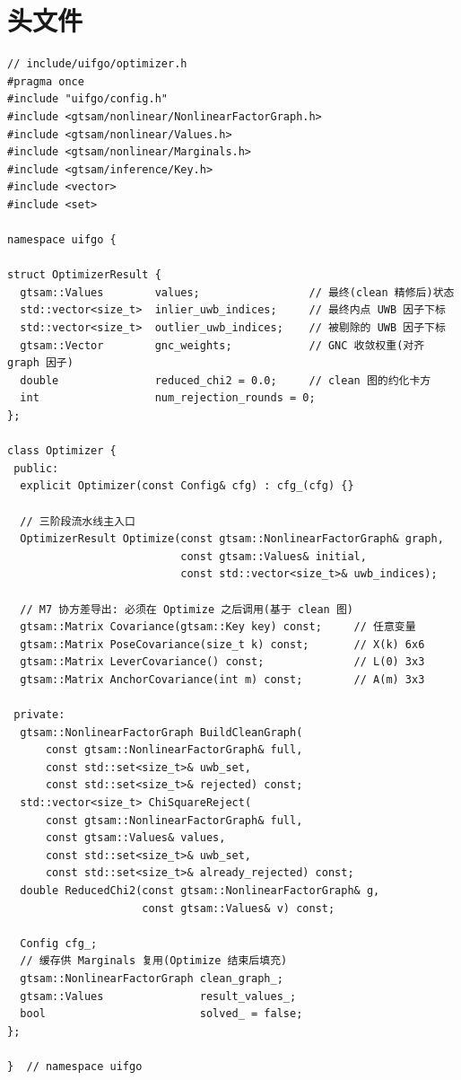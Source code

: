\documentclass[11pt,a4paper]{report}
\begin{document}
\section{头文件}
\begin{lstlisting}[style=cpp]
// include/uifgo/optimizer.h
#pragma once
#include "uifgo/config.h"
#include <gtsam/nonlinear/NonlinearFactorGraph.h>
#include <gtsam/nonlinear/Values.h>
#include <gtsam/nonlinear/Marginals.h>
#include <gtsam/inference/Key.h>
#include <vector>
#include <set>

namespace uifgo {

struct OptimizerResult {
  gtsam::Values        values;                 // 最终(clean 精修后)状态
  std::vector<size_t>  inlier_uwb_indices;     // 最终内点 UWB 因子下标
  std::vector<size_t>  outlier_uwb_indices;    // 被剔除的 UWB 因子下标
  gtsam::Vector        gnc_weights;            // GNC 收敛权重(对齐 graph 因子)
  double               reduced_chi2 = 0.0;     // clean 图的约化卡方
  int                  num_rejection_rounds = 0;
};

class Optimizer {
 public:
  explicit Optimizer(const Config& cfg) : cfg_(cfg) {}

  // 三阶段流水线主入口
  OptimizerResult Optimize(const gtsam::NonlinearFactorGraph& graph,
                           const gtsam::Values& initial,
                           const std::vector<size_t>& uwb_indices);

  // M7 协方差导出: 必须在 Optimize 之后调用(基于 clean 图)
  gtsam::Matrix Covariance(gtsam::Key key) const;     // 任意变量
  gtsam::Matrix PoseCovariance(size_t k) const;       // X(k) 6x6
  gtsam::Matrix LeverCovariance() const;              // L(0) 3x3
  gtsam::Matrix AnchorCovariance(int m) const;        // A(m) 3x3

 private:
  gtsam::NonlinearFactorGraph BuildCleanGraph(
      const gtsam::NonlinearFactorGraph& full,
      const std::set<size_t>& uwb_set,
      const std::set<size_t>& rejected) const;
  std::vector<size_t> ChiSquareReject(
      const gtsam::NonlinearFactorGraph& full,
      const gtsam::Values& values,
      const std::set<size_t>& uwb_set,
      const std::set<size_t>& already_rejected) const;
  double ReducedChi2(const gtsam::NonlinearFactorGraph& g,
                     const gtsam::Values& v) const;

  Config cfg_;
  // 缓存供 Marginals 复用(Optimize 结束后填充)
  gtsam::NonlinearFactorGraph clean_graph_;
  gtsam::Values               result_values_;
  bool                        solved_ = false;
};

}  // namespace uifgo
\end{lstlisting}
\end{document}
